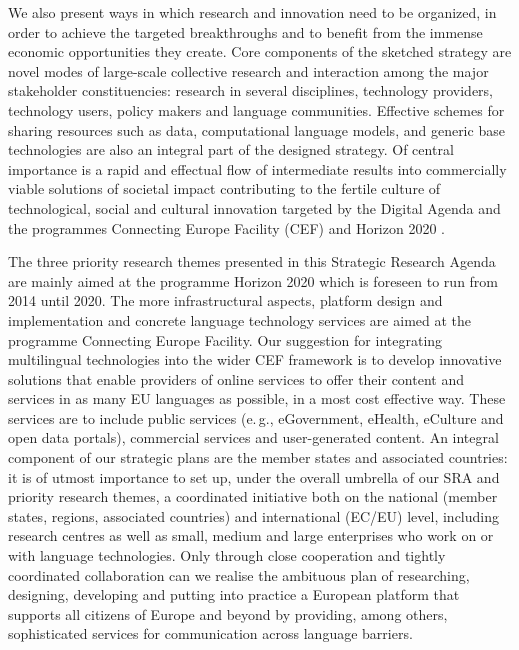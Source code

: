 \documentclass[10pt, plain]{../../metanetpaper}
\begin{document}
\begin{multicols}{2}
We also present ways in which research and innovation need to be organized, in order to achieve the targeted breakthroughs and to benefit from the immense economic opportunities they create. Core components of the sketched strategy are novel modes of large-scale collective research and interaction among the major stakeholder constituencies: research in several disciplines, technology providers, technology users, policy makers and language communities. Effective schemes for sharing resources such as data, computational language models, and generic base technologies are also an integral part of the designed strategy. Of central importance is a rapid and effectual flow of intermediate results into commercially viable solutions of societal impact contributing to the fertile culture of technological, social and cultural innovation targeted by the Digital Agenda \cite{DA2010} and the programmes Connecting Europe Facility (CEF) \cite{CEF2011} and Horizon 2020 \cite{H2020}.


The three priority research themes presented in this Strategic Research Agenda are mainly aimed at the programme Horizon 2020 which is foreseen to run from 2014 until 2020. The more infrastructural aspects, platform design and implementation and concrete language technology services are aimed at the programme Connecting Europe Facility. Our suggestion for integrating multilingual technologies into the wider CEF framework is to develop innovative solutions that enable providers of online services to offer their content and services in as many EU languages as possible, in a most cost effective way. These services are to include public services (e.\,g., eGovernment, eHealth, eCulture and open data portals), commercial services and user-generated content. An integral component of our strategic plans are the member states and associated countries: it is of utmost importance to set up, under the overall umbrella of our SRA and priority research themes, a coordinated initiative both on the national (member states, regions, associated countries) and international (EC/EU) level, including research centres as well as small, medium and large enterprises who work on or with language technologies. Only through close cooperation and tightly coordinated collaboration can we realise the ambituous plan of researching, designing, developing and putting into practice a European platform that supports all citizens of Europe and beyond by providing, among others, sophisticated services for communication across language barriers.
\end{multicols}
\end{document}

